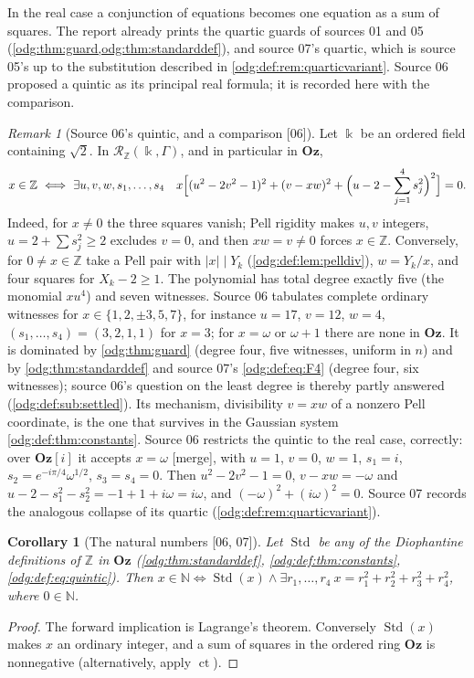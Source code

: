 \documentclass[11pt,oneside]{article}
\numberwithin{equation}{section}
\newtheorem{corollary}[corollary]{Corollary}
\theoremstyle{definition}
\theoremstyle{remark}
\newtheorem{remark}[remark]{Remark}
\newcommand{\Oz}{\mathbf{Oz}}
\newcommand{\Z}{\mathbb Z}
\newcommand{\N}{\mathbb N}
\newcommand{\ct}{\operatorname{ct}}
\newcommand{\Std}{\operatorname{Std}}
\newcommand{\src}[1]{\textup{\textsf{\small[#1]}}}
\newcommand{\mergetag}{\textup{\textsf{\small[merge]}}}
\newcommand{\Og}{\Oz[i]}
\begin{document}
In the real case a conjunction of equations becomes one equation as a sum of
squares. The report already prints the quartic guards of sources 01 and 05
(\cref{odg:thm:guard,odg:thm:standarddef}), and source 07's quartic, which is
source 05's up to the substitution described in
\cref{odg:def:rem:quarticvariant}. Source 06 proposed a quintic as its
principal real formula; it is recorded here with the comparison.

\begin{remark}[Source 06's quintic, and a comparison \src{06}]\label{odg:def:rem:quintic}
Let $\Bbbk$ be an ordered field containing $\sqrt2$. In
$\mathcal R_\Z(\Bbbk,\Gamma)$, and in particular in $\Oz$,
\begin{equation}\label{odg:def:eq:quintic}
 x\in\Z\ \Longleftrightarrow\ \exists u,v,w,s_1,\ldots,s_4\quad
 x\Bigl[(u^2-2v^2-1)^2+(v-xw)^2+\Bigl(u-2-\sum_{j=1}^4s_j^2\Bigr)^2\Bigr]=0 .
\end{equation}
Indeed, for $x\ne0$ the three squares vanish; Pell rigidity makes $u,v$
integers, $u=2+\sum s_j^2\ge2$ excludes $v=0$, and then $xw=v\ne0$ forces
$x\in\Z$. Conversely, for $0\ne x\in\Z$ take a Pell pair with $|x|\mid Y_k$
(\cref{odg:def:lem:pelldiv}), $w=Y_k/x$, and four squares for $X_k-2\ge1$.
The polynomial has total degree exactly five (the monomial $xu^4$) and seven
witnesses. Source 06 tabulates complete ordinary witnesses for
$x\in\{1,2,\pm3,5,7\}$, for instance $u=17$, $v=12$, $w=4$,
$(s_1,\ldots,s_4)=(3,2,1,1)$ for $x=3$; for $x=\omega$ or $\omega+1$ there
are none in $\Oz$. It is dominated by \cref{odg:thm:guard} (degree four, five
witnesses, uniform in $n$) and by \cref{odg:thm:standarddef} and source 07's
\eqref{odg:def:eq:F4} (degree four, six witnesses); source 06's question on
the least degree is thereby partly answered (\cref{odg:def:sub:settled}). Its
mechanism, divisibility $v=xw$ of a nonzero Pell coordinate, is the one that
survives in the Gaussian system \cref{odg:def:thm:constants}. Source 06
restricts the quintic to the real case, correctly: over $\Og$ it accepts
$x=\omega$ \mergetag, with $u=1$, $v=0$, $w=1$, $s_1=i$,
$s_2=e^{-i\pi/4}\omega^{1/2}$, $s_3=s_4=0$. Then $u^2-2v^2-1=0$,
$v-xw=-\omega$ and $u-2-s_1^2-s_2^2=-1+1+i\omega=i\omega$, and
$(-\omega)^2+(i\omega)^2=0$. Source 07 records the analogous collapse of its
quartic (\cref{odg:def:rem:quarticvariant}).
\end{remark}

\begin{corollary}[The natural numbers \src{06, 07}]\label{odg:def:cor:naturals}
Let $\Std$ be any of the Diophantine definitions of $\Z$ in $\Oz$
(\cref{odg:thm:standarddef}, \cref{odg:def:thm:constants},
\eqref{odg:def:eq:quintic}). Then
$x\in\N\Leftrightarrow\Std(x)\wedge\exists r_1,\ldots,r_4\
x=r_1^2+r_2^2+r_3^2+r_4^2$, where $0\in\N$.
\end{corollary}
\begin{proof}
The forward implication is Lagrange's theorem. Conversely $\Std(x)$ makes $x$
an ordinary integer, and a sum of squares in the ordered ring $\Oz$ is
nonnegative (alternatively, apply $\ct$).
\end{proof}
\end{document}
